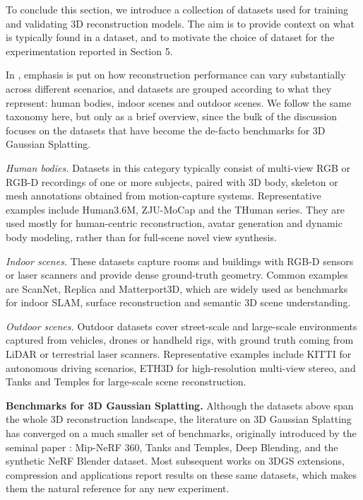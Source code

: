 \documentclass[
	a4paper, %
	10pt, %
	unnumberedsections, %
	twoside, %
]{LTJournalArticle}
\begin{document}
To conclude this section, we introduce a collection of datasets used for training and validating 3D reconstruction models. The aim is to provide context on what is typically found in a dataset, and to motivate the choice of dataset for the experimentation reported in Section 5.

In \cite{datasets_3drecon}, emphasis is put on how reconstruction performance can vary substantially across different scenarios, and datasets are grouped according to what they represent: human bodies, indoor scenes and outdoor scenes. We follow the same taxonomy here, but only as a brief overview, since the bulk of the discussion focuses on the datasets that have become the de-facto benchmarks for 3D Gaussian Splatting.

\textit{Human bodies.} Datasets in this category typically consist of multi-view RGB or RGB-D recordings of one or more subjects, paired with 3D body, skeleton or mesh annotations obtained from motion-capture systems. Representative examples include Human3.6M, ZJU-MoCap and the THuman series. They are used mostly for human-centric reconstruction, avatar generation and dynamic body modeling, rather than for full-scene novel view synthesis.

\textit{Indoor scenes.} These datasets capture rooms and buildings with RGB-D sensors or laser scanners and provide dense ground-truth geometry. Common examples are ScanNet, Replica and Matterport3D, which are widely used as benchmarks for indoor SLAM, surface reconstruction and semantic 3D scene understanding.

\textit{Outdoor scenes.} Outdoor datasets cover street-scale and large-scale environments captured from vehicles, drones or handheld rigs, with ground truth coming from LiDAR or terrestrial laser scanners. Representative examples include KITTI for autonomous driving scenarios, ETH3D for high-resolution multi-view stereo, and Tanks and Temples for large-scale scene reconstruction.

\textbf{Benchmarks for 3D Gaussian Splatting.} Although the datasets above span the whole 3D reconstruction landscape, the literature on 3D Gaussian Splatting has converged on a much smaller set of benchmarks, originally introduced by the seminal paper \cite{kerbl20233dgs}: Mip-NeRF 360, Tanks and Temples, Deep Blending, and the synthetic NeRF Blender dataset. Most subsequent works on 3DGS extensions, compression and applications report results on these same datasets, which makes them the natural reference for any new experiment.
\end{document}
